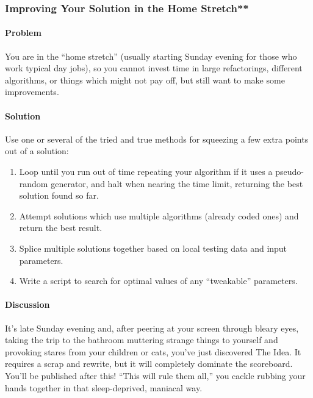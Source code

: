 \documentclass[]{article}
\let\oldparagraph\paragraph
\renewcommand{\paragraph}[1]{\oldparagraph{#1}\mbox{}}
\begin{document}
\hypertarget{improving-your-solution-in-the-home-stretch}{%
\subsubsection{Improving Your Solution in the Home
Stretch**}\label{improving-your-solution-in-the-home-stretch}}

\hypertarget{problem-5}{%
\paragraph{Problem}\label{problem-5}}

You are in the ``home stretch'' (usually starting Sunday evening for
those who work typical day jobs), so you cannot invest time in large
refactorings, different algorithms, or things which might not pay off,
but still want to make some improvements.

\hypertarget{solution-5}{%
\paragraph{Solution}\label{solution-5}}

Use one or several of the tried and true methods for squeezing a few
extra points out of a solution:

\begin{enumerate}
\def\labelenumi{\arabic{enumi}.}
\item
  Loop until you run out of time repeating your algorithm if it uses a
  pseudo-random generator, and halt when nearing the time limit,
  returning the best solution found so far.
\item
  Attempt solutions which use multiple algorithms (already coded ones)
  and return the best result.
\item
  Splice multiple solutions together based on local testing data and
  input parameters.
\item
  Write a script to search for optimal values of any ``tweakable''
  parameters.
\end{enumerate}

\hypertarget{discussion-4}{%
\paragraph{Discussion}\label{discussion-4}}

It's late Sunday evening and, after peering at your screen through
bleary eyes, taking the trip to the bathroom muttering strange things to
yourself and provoking stares from your children or cats, you've just
discovered The Idea. It requires a scrap and rewrite, but it will
completely dominate the scoreboard. You'll be published after this!
``This will rule them all,'' you cackle rubbing your hands together in
that sleep-deprived, maniacal way.
\end{document}
